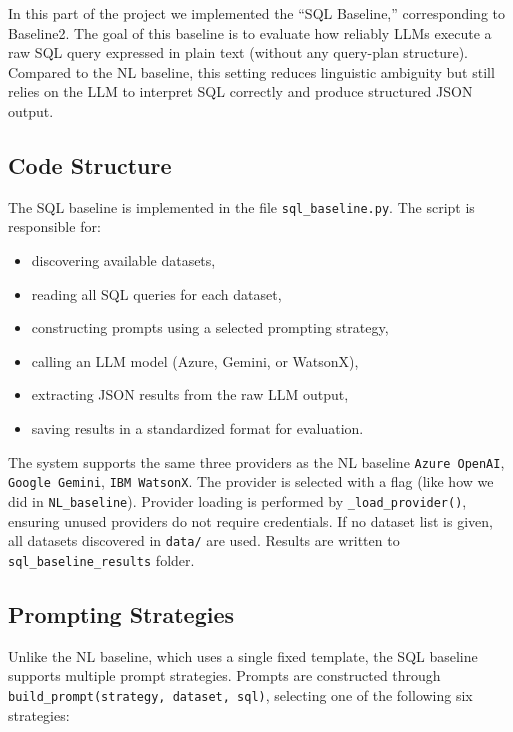 \documentclass[12pt]{article}
\begin{document}
In this part of the project we implemented the ``SQL Baseline,'' corresponding to Baseline2.  
The goal of this baseline is to evaluate how reliably LLMs execute a raw SQL query expressed in plain text (without any query-plan structure).  
Compared to the NL baseline, this setting reduces linguistic ambiguity but still relies on the LLM to interpret SQL correctly and produce structured JSON output.

\subsection{Code Structure}

The SQL baseline is implemented in the file \texttt{sql\_baseline.py}. 
The script is responsible for:
\begin{itemize}
    \item discovering available datasets,
    \item reading all SQL queries for each dataset,
    \item constructing prompts using a selected prompting strategy,
    \item calling an LLM model (Azure, Gemini, or WatsonX),
    \item extracting JSON results from the raw LLM output,
    \item saving results in a standardized format for evaluation.
\end{itemize}

The system supports the same three providers as the NL baseline \texttt{Azure OpenAI}, \texttt{Google Gemini}, \texttt{IBM WatsonX}. The provider is selected with a flag (like how we did in \texttt{NL\_baseline}).  
Provider loading is performed by \verb|_load_provider()|, ensuring unused providers do not require credentials. If no dataset list is given, all datasets discovered in \texttt{data/} are used.  
Results are written to \texttt{sql\_baseline\_results}  folder.

\subsection{Prompting Strategies}

Unlike the NL baseline, which uses a single fixed template, the SQL baseline supports multiple prompt strategies.  
Prompts are constructed through \verb|build_prompt(strategy, dataset, sql)|, selecting one of the following six strategies:
\end{document}
